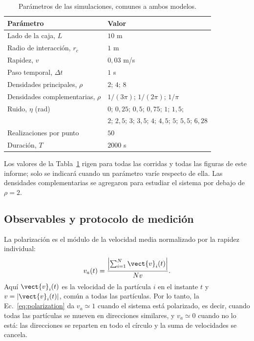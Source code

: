 \documentclass[11pt,a4paper]{article}
\newcommand{\va}{\ensuremath{v_{a}}}
\begin{document}
\begin{table}[!htb]
    \centering
    \begin{tabular}{ll}
        \toprule
        Parámetro & Valor \\
        \midrule
        Lado de la caja, $L$ & $10$ m \\
        Radio de interacción, $r_c$ & $1$ m \\
        Rapidez, $v$ & $0{,}03$ m/s \\
        Paso temporal, $\Delta t$ & $1$ s \\
        Densidades principales, $\rho$ & $2$; $4$; $8$ \\
        Densidades complementarias, $\rho$ & $1/(3\pi)$; $1/(2\pi)$; $1/\pi$ \\
        Ruido, $\eta$ (rad) & $0$; $0{,}25$; $0{,}5$; $0{,}75$; $1$; $1{,}5$; \\
        & $2$; $2{,}5$; $3$; $3{,}5$; $4$; $4{,}5$; $5$; $5{,}5$; $6{,}28$ \\
        Realizaciones por punto & $50$ \\
        Duración, $T$ & $2000$ s \\
        \bottomrule
    \end{tabular}
    \caption{Parámetros de las simulaciones, comunes a ambos modelos.}
    \label{tab:parametros}
\end{table}

Los valores de la Tabla~\ref{tab:parametros} rigen para todas las corridas y
todas las figuras de este informe; solo se indicará cuando un parámetro varíe
respecto de ella. Las densidades complementarias se agregaron para estudiar
el sistema por debajo de $\rho=2$.

\subsection{Observables y protocolo de medición}

La polarización es el módulo de la velocidad media normalizado por la rapidez
individual:
\begin{equation}
    \va(t) = \frac{\left|\sum_{i=1}^{N}\vect{v}_i(t)\right|}{N v}.
    \label{eq:polarization}
\end{equation}
Aquí $\vect{v}_i(t)$ es la velocidad de la partícula $i$ en el instante $t$ y
$v=|\vect{v}_i(t)|$, común a todas las partículas. Por lo tanto, la
Ec.~\eqref{eq:polarization} da $\va\simeq1$ cuando el sistema está polarizado,
es decir, cuando todas las partículas se mueven en direcciones similares, y
$\va\simeq0$ cuando no lo está: las direcciones se reparten en todo el
círculo y la suma de velocidades se cancela.
\end{document}
